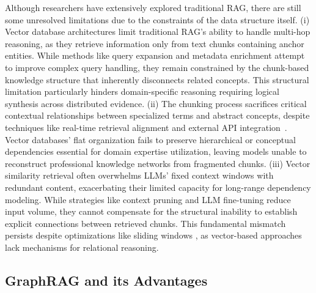 \documentclass{article} %
\begin{document}
Although researchers have extensively explored traditional RAG, there are still some unresolved limitations due to the constraints of the data structure itself. (i) Vector database architectures limit traditional RAG's ability to handle multi-hop reasoning, as they retrieve information only from text chunks containing anchor entities. While methods like query expansion \citep{mao2020generation} and metadata enrichment \citep{wang2024searchingforbestpractivesinrag} attempt to improve complex query handling, they remain constrained by the chunk-based knowledge structure that inherently disconnects related concepts. This structural limitation particularly hinders domain-specific reasoning requiring logical synthesis across distributed evidence.
(ii) 
The chunking process sacrifices critical contextual relationships between specialized terms and abstract concepts, despite techniques like real-time retrieval alignment \citep{jiang2024piperag} and external API integration~\citep{lazaridou2022internet}. Vector databases' flat organization fails to preserve hierarchical or conceptual dependencies essential for domain expertise utilization, leaving models unable to reconstruct professional knowledge networks from fragmented chunks.
(iii) Vector similarity retrieval often overwhelms LLMs' fixed context windows \citep{openai2023gpt4,anthropic2024claude} with redundant content, exacerbating their limited capacity for long-range dependency modeling. While strategies like context pruning \citep{arefeen2024leancontext} and LLM fine-tuning \citep{luo2023sail} reduce input volume, they cannot compensate for the structural inability to establish explicit connections between retrieved chunks. This fundamental mismatch persists despite optimizations like sliding windows \citep{wang2024searchingforbestpractivesinrag}, as vector-based approaches lack mechanisms for relational reasoning.

\subsection{GraphRAG and its Advantages}
\end{document}
